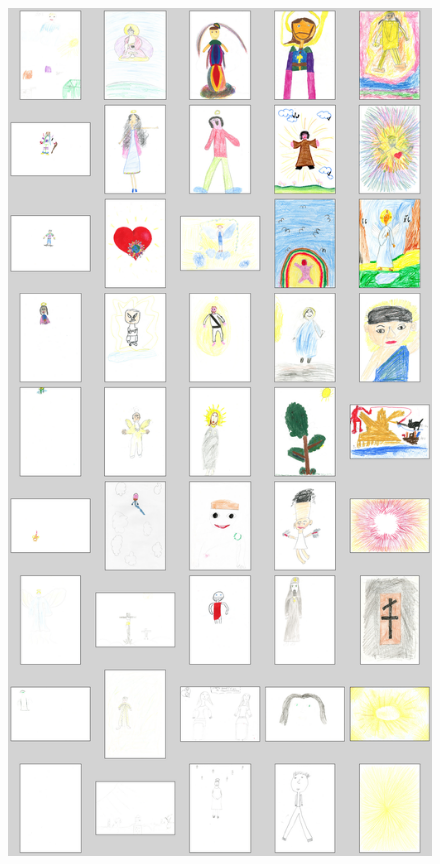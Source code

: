 \documentclass[11pt,a4paper]{article}
\begin{document}
\begin{figure}[h!]
	\centering
	\includegraphics[width=\linewidth]{figures/colors-grille.png}
	\caption{ }
	\label{}
\end{figure}
\end{document}
